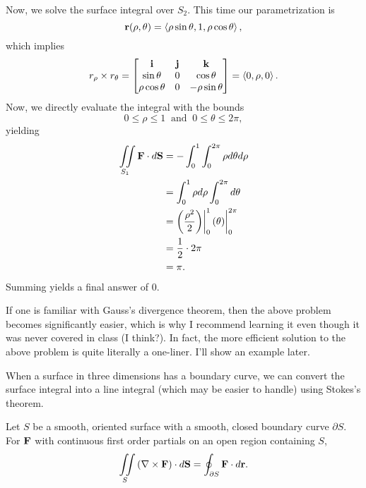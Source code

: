 \begin{soln}
    Now, we solve the surface integral over $S_{2}$. This time our parametrization is
    \[\mathbf{r}(\rho, \theta) = \left<\rho\sin\theta, 1, \rho\cos\theta\right>,\]
    which implies
    \[r_{\rho} \times r_{\theta} = \begin{bmatrix}
        \mathbf{i} & \mathbf{j} & \mathbf{k} \\
        \sin\theta & 0 & \cos\theta \\
        \rho\cos\theta & 0 & -\rho\sin\theta
    \end{bmatrix} = \left<0, \rho, 0\right>.\]
    Now, we directly evaluate the integral with the bounds
    \[0 \leq \rho \leq 1 \;\; \text{and} \;\; 0 \leq \theta \leq 2\pi,\]
    yielding
    \begin{align*}
        \iint\limits_{S_{1}}\mathbf{F} \cdot d\mathbf{S} &= -\int_{0}^{1}\int_{0}^{2\pi} \rho d\theta d\rho \\
        &= \int_{0}^{1} \rho d\rho \int_{0}^{2\pi} d\theta \\
        &= \left(\frac{\rho^{2}}{2}\right) \biggr\rvert_{0}^{1} \left(\theta\right) \biggr\rvert_{0}^{2\pi} \\
        &= \frac{1}{2} \cdot 2\pi \\
        &= \pi.
    \end{align*}
    Summing yields a final answer of $\boxed{0}$.
\end{soln}

\begin{remark}
    If one is familiar with Gauss's divergence theorem, then the above problem becomes significantly easier, which is why I recommend learning it even though it was never covered in class (I think?). In fact, the more efficient solution to the above problem is quite literally a one-liner. I'll show an example later.
\end{remark}

When a surface in three dimensions has a boundary curve, we can convert the surface integral into a line integral (which may be easier to handle) using Stokes's theorem.

\begin{theorem}
    Let $S$ be a smooth, oriented surface with a smooth, closed boundary curve $\partial S$. For $\mathbf{F}$ with continuous first order partials on an open region containing $S$,
    \[\iint\limits_{S}\left(\nabla \times \mathbf{F}\right) \cdot d\mathbf{S} = \oint_{\partial S}\mathbf{F} \cdot d\mathbf{r}.\]
\end{theorem}

